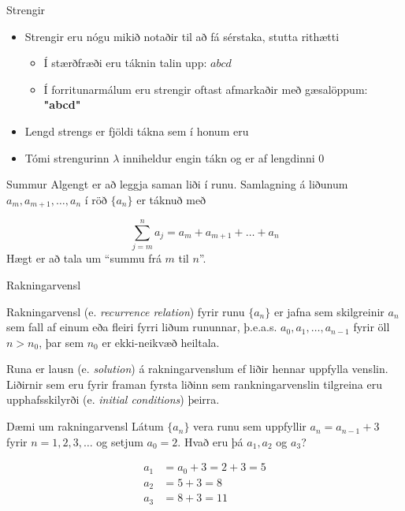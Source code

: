 \documentclass[handout]{beamer}
\begin{document}
\begin{frame}{Strengir}
    \begin{itemize}
        \item Strengir eru nógu mikið notaðir til að fá sérstaka, stutta rithætti
        \begin{itemize}
            \item Í stærðfræði eru táknin talin upp: $abcd$
            \item Í forritunarmálum eru strengir oftast afmarkaðir með gæsalöppum: \textbf{"abcd"}
        \end{itemize}
        \item Lengd strengs er fjöldi tákna sem í honum eru
        \item Tómi strengurinn $\lambda$ inniheldur engin tákn og er af lengdinni 0
    \end{itemize}
\end{frame}

\begin{frame}{Summur}
    Algengt er að leggja saman liði í runu. Samlagning á liðunum $a_m, a_{m+1}, \ldots, a_n$ í röð $\{a_n\}$ er táknuð með

    \[
        \sum_{j=m}^n a_j = a_m + a_{m+1} + \ldots + a_n
    \]
    Hægt er að tala um ``summu frá $m$ til $n$''.
\end{frame}

\begin{frame}{Rakningarvensl}
\begin{tcolorbox}[title=Rakningarvensl]
Rakningarvensl (e. \emph{recurrence relation}) fyrir runu $\{a_n\}$ er jafna sem skilgreinir $a_n$ sem fall af einum eða fleiri fyrri liðum rununnar, þ.e.a.s. $a_0, a_1, \ldots, a_{n-1}$ fyrir öll $n > n_0$, þar sem $n_0$ er ekki-neikvæð heiltala.
\end{tcolorbox}
Runa er lausn (e. \emph{solution}) á rakningarvenslum ef liðir hennar uppfylla venslin. Liðirnir sem eru fyrir framan fyrsta liðinn sem rankningarvenslin tilgreina eru upphafsskilyrði (e. \emph{initial conditions}) þeirra.
\end{frame}

\begin{frame}{Dæmi um rakningarvensl}
Látum $\{a_n\}$ vera runu sem uppfyllir $a_n = a_{n-1} + 3$ fyrir $n=1, 2, 3, \ldots$ og setjum $a_0 = 2$. Hvað eru þá $a_1, a_2$ og $a_3$? \pause

\begin{align*}
a_1 &= a_0 + 3 = 2 + 3 = 5\\
a_2 &= 5 + 3 = 8\\
a_3 &= 8 + 3 = 11\\
\end{align*}

\end{frame}
\end{document}
